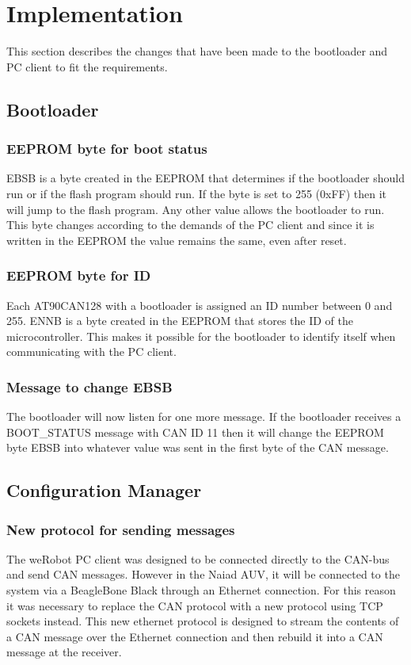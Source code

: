 \section{Implementation}\label{sec:implementation}
This section describes the changes that have been made to the bootloader and PC client to fit the requirements.




\subsection{Bootloader}
\subsubsection{EEPROM byte for boot status}
EBSB is a byte created in the EEPROM that determines if the bootloader should run or if the flash program should run. If the byte is set to 255 (0xFF) then it will jump to the flash program. Any other value allows the bootloader to run. This byte changes according to the demands of the PC client and since it is written in the EEPROM the value remains the same, even after reset.

\subsubsection{EEPROM byte for ID}
Each AT90CAN128 with a bootloader is assigned an ID number between 0 and 255. ENNB is a byte created in the EEPROM that stores the ID of the microcontroller. This makes it possible for the bootloader to identify itself when communicating with the PC client.

\subsubsection{Message to change EBSB}
The bootloader will now listen for one more message. If the bootloader receives a BOOT\_STATUS message with CAN ID 11 then it will change the EEPROM byte EBSB into whatever value was sent in the first byte of the CAN message.

\subsection{Configuration Manager}

\subsubsection{New protocol for sending messages}
The weRobot PC client was designed to be connected directly to the CAN-bus and send CAN messages. However in the Naiad AUV, it will be connected to the system via a BeagleBone Black through an Ethernet connection. For this reason it was necessary to replace the CAN protocol with a new protocol using TCP sockets instead. This new ethernet protocol is designed to stream the contents of a CAN message over the Ethernet connection and then rebuild it into a CAN message at the receiver. 

